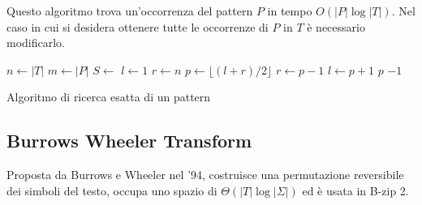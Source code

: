 Questo algoritmo trova un'occorrenza del pattern $P$ in tempo $O(|P| \log |T|)$.
Nel caso in cui si desidera ottenere tutte le occorrenze di $P$ in $T$ è
necessario modificarlo.
\begin{algorithm}[!ht]
    \begin{algorithmic}
        \State $n \gets |T|$
        \State $m \gets |P|$
        \State $S \gets$ 
        \State $l \gets 1$
        \State $r \gets n$
        \State $p \gets \lfloor (l + r) / 2 \rfloor$
        \State $r \gets p - 1$
        \State $l \gets p + 1$
        \Else
        \State \Return $p$
        \EndIf
        \EndWhile
        \State \Return $-1$
        \EndFunction
    \end{algorithmic}
    \caption{Algoritmo di ricerca esatta di un pattern}
\end{algorithm}
\subsection{Burrows Wheeler Transform}
Proposta da Burrows e Wheeler nel '94, costruisce una permutazione reversibile
dei simboli del testo, occupa uno spazio di $\Theta(|T| \log |\Sigma|)$ ed è
usata in B-zip 2.

